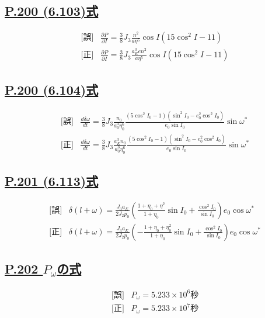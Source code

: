 \documentclass[9pt,fleqn]{bxjsarticle}
\begin{document}
\subsection*{\underline{P.200 (6.103)式}}
\begin{align*}
    &\text{[誤]} \hspace{10pt} \frac{\partial{P}}{\partial{I}} = \frac{3}{8}J_3\frac{n^2}{a\eta^5}\cos{I}\left(15\cos^2{I}-11\right) \\
    &\text{[正]} \hspace{10pt} \frac{\partial{P}}{\partial{I}} = \frac{3}{8}J_3\frac{a_E^3en^2}{a\eta^5}\cos{I}\left(15\cos^2{I}-11\right)
\end{align*}

\subsection*{\underline{P.200 (6.104)式}}
\begin{align*}
    &\text{[誤]} \hspace{10pt} \frac{d\delta\omega}{dt} = \frac{3}{8}J_3\frac{n_0}{a_0^3\eta_0^6}\frac{\left(5\cos^2{I_0}-1\right)\left(\sin^2{I_0}-e_0^2\cos^2{I_0}\right)}{e_0\sin{I_0}}\sin{\omega^*} \\
    &\text{[正]} \hspace{10pt} \frac{d\delta\omega}{dt} = \frac{3}{8}J_3\frac{a_E^3n_0}{a_0^3\eta_0^6}\frac{\left(5\cos^2{I_0}-1\right)\left(\sin^2{I_0}-e_0^2\cos^2{I_0}\right)}{e_0\sin{I_0}}\sin{\omega^*}
\end{align*}

\subsection*{\underline{P.201 (6.113)式}}
\begin{align*}
    &\text{[誤]} \hspace{10pt} \delta(l+\omega) = \frac{J_3a_E}{2J_2p_0}\left(\frac{1+\eta_0+\eta^2}{1+\eta_0}\sin{I_0}+\frac{\cos^2{I_0}}{\sin{I_0}}\right)e_0\cos{\omega^*} \\
    &\text{[正]} \hspace{10pt} \delta(l+\omega) = \frac{J_3a_E}{2J_2p_0}\left(-\frac{1+\eta_0+\eta_0^2}{1+\eta_0}\sin{I_0}+\frac{\cos^2{I_0}}{\sin{I_0}}\right)e_0\cos{\omega^*} 
\end{align*}

\subsection*{\underline{P.202 $P_\omega$の式}}
\begin{align*}
    &\text{[誤]} \hspace{10pt} P_\omega = 5.233{\times}10^6\text{秒} \\
    &\text{[正]} \hspace{10pt} P_\omega = 5.233{\times}10^7\text{秒}
\end{align*}
\end{document}
